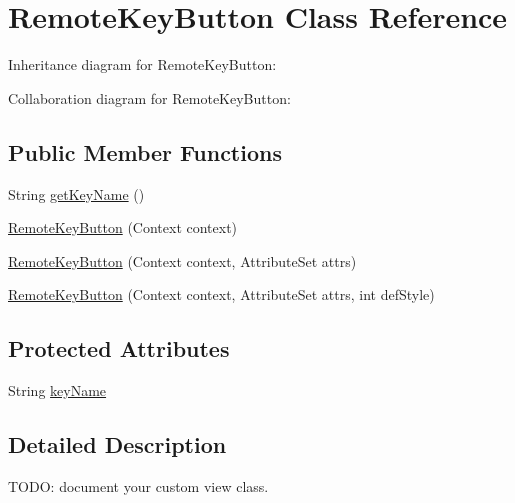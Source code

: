 \hypertarget{classcom_1_1axcoto_1_1shinjuku_1_1sushi_1_1_remote_key_button}{\section{\-Remote\-Key\-Button \-Class \-Reference}
\label{classcom_1_1axcoto_1_1shinjuku_1_1sushi_1_1_remote_key_button}
}


\-Inheritance diagram for \-Remote\-Key\-Button\-:


\-Collaboration diagram for \-Remote\-Key\-Button\-:
\subsection*{\-Public \-Member \-Functions}
\begin{DoxyCompactItemize}
\item 
\-String \hyperlink{classcom_1_1axcoto_1_1shinjuku_1_1sushi_1_1_remote_key_button_a5c1b5fc2f10c7f59a3069907e3bda40d}{get\-Key\-Name} ()
\item 
\hyperlink{classcom_1_1axcoto_1_1shinjuku_1_1sushi_1_1_remote_key_button_af5d30635b80641f7df2bcdb2a3b979c7}{\-Remote\-Key\-Button} (\-Context context)
\item 
\hyperlink{classcom_1_1axcoto_1_1shinjuku_1_1sushi_1_1_remote_key_button_ac85e9a69ddd3615144b7d0a9245b597e}{\-Remote\-Key\-Button} (\-Context context, \-Attribute\-Set attrs)
\item 
\hyperlink{classcom_1_1axcoto_1_1shinjuku_1_1sushi_1_1_remote_key_button_a3bad8c4aae55c38dd14f87d5387ffa4f}{\-Remote\-Key\-Button} (\-Context context, \-Attribute\-Set attrs, int def\-Style)
\end{DoxyCompactItemize}
\subsection*{\-Protected \-Attributes}
\begin{DoxyCompactItemize}
\item 
\-String \hyperlink{classcom_1_1axcoto_1_1shinjuku_1_1sushi_1_1_remote_key_button_a89c32c1f801aee1e2f7bc48b676f3428}{key\-Name}
\end{DoxyCompactItemize}


\subsection{\-Detailed \-Description}
\-T\-O\-D\-O\-: document your custom view class. 


